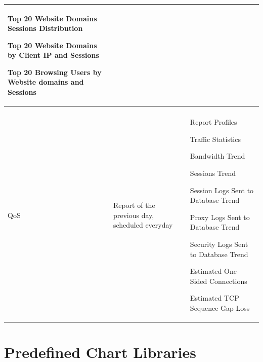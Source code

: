 \begin{longtable}{p{}|p{}|p{}}
                                                                                                    Top 20 Website Domains Sessions Distribution


                                                                                                    Top 20 Website Domains by Client IP and Sessions


                                                                                                    Top 20 Browsing Users by Website domains and Sessions \\\hline
 
    \tabincell{l}{Traffic\\ QoS} &	Report of the previous day, scheduled everyday &	Report Profiles


                                                                                        Traffic Statistics


                                                                                        Bandwidth Trend


                                                                                        Sessions Trend 


                                                                                        Session Logs Sent to Database Trend


                                                                                        Proxy Logs Sent to Database Trend


                                                                                        Security Logs Sent to Database Trend


                                                                                        Estimated One-Sided Connections


                                                                                        Estimated TCP Sequence Gap Loss \\\hline

\end{longtable}

\section*{\hypertarget{link:Predefined Chart Libraries}{Predefined Chart Libraries}}
\label{sec:appendix_d:chart}

